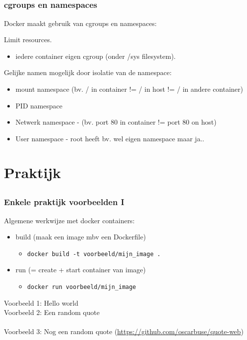 \subsection{}
\begin{styleframe}
    \frametitle{cgroups en namespaces}
Docker maakt gebruik van cgroups en namespaces:
\pause
\begin{description}[namespacesbla]
	\item[cgroups] Limit resources.
	\pause
	\begin{itemize}
		\item iedere container eigen cgroup (onder /sys filesystem).
	\end{itemize}
	\pause
	\item[namespaces] Gelijke namen mogelijk door isolatie van de namespace:
	\begin{itemize}
		\pause
		\item mount namespace (bv. / in container != / in host != / in andere container)
		\pause
		\item PID namespace
		\pause
		\item Netwerk namespace - (bv. port 80 in container != port 80 on host)
		\pause
		\item User namespace - root heeft bv. wel eigen namespace maar ja.. 
	\end{itemize}
\end{description}
\end{styleframe}

\section{Praktijk}
\subsection{}
\begin{styleframefrag}
    \frametitle{Enkele praktijk voorbeelden I}
Algemene werkwijze met docker containers:
\begin{itemize}
	\pause
	\item build (maak een image mbv een Dockerfile)
	\begin{itemize}
		\pause
		\item \verb!docker build -t voorbeeld/mijn_image .!
	\end{itemize}
	\pause
	\item run (= create + start container van image)
	\begin{itemize}
		\pause
		\item \verb!docker run voorbeeld/mijn_image!
	\end{itemize}
\end{itemize}
\pause
Voorbeeld 1: Hello world\\
\pause
Voorbeeld 2: Een random quote\\
\pause
~\\
Voorbeeld 3: Nog een random quote (\url{https://github.com/oscarbuse/quote-web})\\
\end{styleframefrag}


